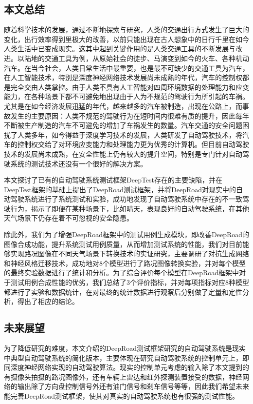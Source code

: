 \begin{conclusions}
 
\subsection{本文总结}

随着科学技术的发展，通过不断地探索与研究，人类的交通出行方式发生了巨大的变化，出行效率得到里极大的改善，以前只能出现在古人想象中的日行千里在如今人类生活中已变成现实。这其中起到关键作用的是人类交通工具的不断发展与改进。以陆地的交通工具为例，从原始社会的徒步、马演变到如今的火车、各种机动汽车。在当今社会，人类日常生活中最重要，也是最不可缺少的交通工具为汽车，在人工智能技术，特别是深度神经网络技术发展尚未成熟的年代，汽车的控制权都是完全交由人类掌控。由于人类不具有人工智能对四周环境数据的处理能力和应变能力，在各种场景下都不可避免地出现由于人为不规范的驾驶行为所引起的车祸。尤其是在如今经济发展迅猛的年代，越来越多的汽车被制造，出现在公路上，而事故发生的主要原因：人类不规范的驾驶行为在短时间内很难有质的提升，因此每年不断被生产制造的汽车不可避免的增加了车祸发生的数量。汽车交通的安全问题困扰了人类多年，如今得益于深度学习技术的发展，人类研发了自动驾驶技术，将汽车的控制权交给了对环境应变能力和处理能力更为优秀的计算机。但目前自动驾驶技术的发展尚未成熟，在安全性能上仍有较大的提升空间，特别是专门针对自动驾驶系统的测试技术还没有一个很好的解决方案。

本文探讨了已有的自动驾驶系统测试框架DeepTest存在的主要缺陷，并在DeepTest框架的基础上提出了DeepRoad测试框架，并将DeepRoad对现实中的自动驾驶系统进行了系统测试和实验，成功地发现了自动驾驶系统中存在的不一致驾驶行为，揭示了即便在某种场景下，比如晴天，表现良好的自动驾驶系统，在其他天气场景下仍存在着不可忽视的安全隐患。

除此外，我们为了增强DeepRoad框架中的测试用例生成模块，即改善DeepRoad的图像合成功能，提升系统测试用例质量，从而增加测试系统的性能，我们对目前能够实现路况图像在不同天气场景下转换技术的实证研究，主要调研了对抗生成网络和神经风格迁移技术，成功地对8个模型进行了路况图像转换实验，并对每个模型的最终实验数据进行了统计和分析。为了综合评价每个模型在DeepRoad框架中对于测试用例合成性能的优劣，我们总结了3个评价指标，并对每项指标对应8种模型都进行了实验和数据统计，在对最终的统计数据进行观察后分别做了定量和定性分析，得出了相应的结论。

\subsection{未来展望}

为了降低研究的难度，本文介绍的DeepRoad测试框架研究的自动驾驶系统是现实中典型自动驾驶系统的简化版本，主要体现在研究自动驾驶系统的控制单元上，即同深度神经网络实现的自动驾驶算法。现实的控制单元考虑的输入除了本文提到的有摄像头拍摄的路况图像外，还有车辆上雷达和红外探测装置接受的数据，神经网络的输出除了方向盘控制信号外还有油门信号和刹车信号等等，因此我们希望未来能完善DeepRoad测试框架，使其对真实的自动驾驶系统也有很强的测试性能。


\end{conclusions}
